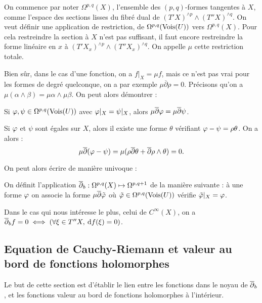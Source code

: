 On commence par noter $\Omega^{p,q}(X)$, l'ensemble des $(p,q)$-formes tangentes à $X$, comme l'espace des sections lisses du fibré dual de $(T'X)^{\wedge p} \wedge (T''X)^{\wedge q}$. On veut définir une application de restriction, de $\Omega^{p,q}(\operatorname{Vois} (U))$ vers $\Omega^{p,q}(X)$. Pour cela restreindre la section à $X$ n'est pas suffisant, il faut encore restreindre la forme linéaire en $x$ à $(T'X_x)^{\wedge p} \wedge (T''X_x)^{\wedge q}$. On appelle $\mu$ cette restriction totale. 

Bien sûr, dans le cas d'une fonction, on a $f|_X = \mu f$, mais ce n'est pas vrai pour les formes de degré quelconque, on a par exemple $\mu \overline{\partial}\rho =0$. Précisons qu'on a $\mu(\alpha \wedge \beta) = \mu \alpha \wedge \mu \beta$. On peut alors démontrer :

\begin{lem}
	Si $\varphi,\psi \in \Omega^{p,q}(\operatorname{Vois} (U))$ avec $\varphi|_X=\psi|_X$, alors $\mu \overline{\partial}\varphi = \mu \overline{\partial}\psi$.
\end{lem}
\begin{preuve}
	Si $\varphi$ et $\psi$ sont égales sur $X$, alors il existe une forme $\theta$ vérifiant $\varphi-\psi = \rho\theta$. On a alors :
	\begin{equation*}
		\mu \overline{\partial}(\varphi-\psi) = \mu(\rho \overline{\partial}\theta + \overline{\partial}\rho \wedge \theta) = 0.
	\end{equation*}
\end{preuve}

On peut alors écrire de manière univoque :
\begin{defn}
	On définit l'application $\overline{\partial}_b : \Omega^{p,q}(X)\mapsto \Omega^{p,q+1}$ de la manière suivante : à une forme $\varphi$ on associe la forme $\mu \overline{\partial}\tilde{\varphi}$ où $\tilde{\varphi} \in \Omega^{p,q}(\operatorname{Vois}(U))$ vérifie $\tilde{\varphi}|_X=\varphi$.
\end{defn}
\begin{rem}
	Dans le cas qui nous intéresse le plus, celui de $C^{\infty}(X)$, on a $\overline{\partial}_b f = 0 \iff (\forall \xi \in T''X,\:\mathrm{d} f(\xi)=0)$.
\end{rem}

\subsection{Equation de Cauchy-Riemann et valeur au bord de fonctions holomorphes}
Le but de cette section est d'établir le lien entre les fonctions dans le noyau de $\overline{\partial}_b$, et les fonctions valeur au bord de fonctions holomorphes à l'intérieur.


